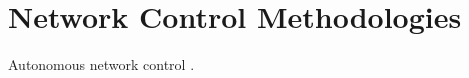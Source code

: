 \section{Network Control Methodologies}
\label{ch-review:sec:network-control-methodologies}



Autonomous network control \cite{Nogaret1997a}.